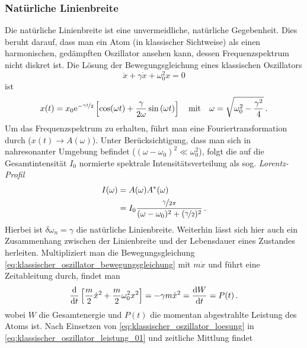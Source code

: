 \subsubsection{Natürliche
Linienbreite}\label{subsubsec:natuerliche_linienbreite}
Die natürliche Linienbreite ist eine unvermeidliche, natürliche Gegebenheit.
Dies beruht darauf, dass man ein Atom (in klassischer Sichtweise) als
einen harmonischen, gedämpften Oszillator ansehen kann, dessen Frequenzspektrum
nicht diskret ist. Die Lösung der Bewegungsgleichung eines klassischen
Oszillators
\begin{equation}\label{eq:klassischer_oszillator_bewegungsgleichung}
	\ddot x+\gamma\dot x+\omega_0^2x=0
\end{equation}
ist
\begin{equation}\label{eq:klassischer_oszillator_loesung}
	x(t)=x_0\mathrm{e}^{-\nicefrac{\gamma t}{2}}\left[\cos(\omega
	t)+\frac{\gamma}{2\omega}\sin{(\omega t)}\right]\quad
	\text{mit}\quad \omega=\sqrt{\omega_0^2-\frac{\gamma^2}{4}}\,.
\end{equation}
Um das Frequenzspektrum zu erhalten, führt man eine Fouriertransformation durch
($x(t)\to A(\omega)$). Unter Berücksichtigung, dass man sich in nahresonanter
Umgebung befindet ($(\omega-\omega_0)^2\ll\omega_0^2$), folgt die auf die
Gesamtintensität $I_0$ normierte spektrale Intensitätsverteilung als sog.
\textit{Lorentz-Profil}
\begin{equation}\label{eq:lorentz-profil}
	\begin{split}
		I(\omega) &=A(\omega)A^*(\omega)\\
		&=
		I_0\frac{\nicefrac{\gamma}{2\pi}}{(\omega-\omega_0)^2+(\nicefrac{\gamma}{2})^2}\,.
	\end{split}
\end{equation}
Hierbei ist $\delta\omega_n=\gamma$ die natürliche Linienbreite. Weiterhin lässt
sich hier auch ein Zusammenhang zwischen der Linienbreite und der Lebensdauer
eines Zustandes herleiten. Multipliziert man die Bewegungsgleichung
\eqref{eq:klassischer_oszillator_bewegungsgleichung} mit $m\dot x$ und führt
eine Zeitableitung durch, findet man
\begin{equation}\label{eq:klassischer_oszillator_leistung_01}
	\frac{\mathrm{d} }{\mathrm{d} t}\left[\frac{m}{2}\dot
	x^2+\frac{m}{2}\omega_0^2x^2\right]=-\gamma m\dot x^2=\frac{\mathrm{d} W}{\mathrm{d} t}=P(t)\,.
\end{equation}
wobei $W$ die Gesamtenergie und $P(t)$ die momentan abgestrahlte Leistung des
Atoms ist. Nach Einsetzen von \eqref{eq:klassischer_oszillator_loesung} in
\eqref{eq:klassischer_oszillator_leistung_01} und zeitliche Mittlung findet

